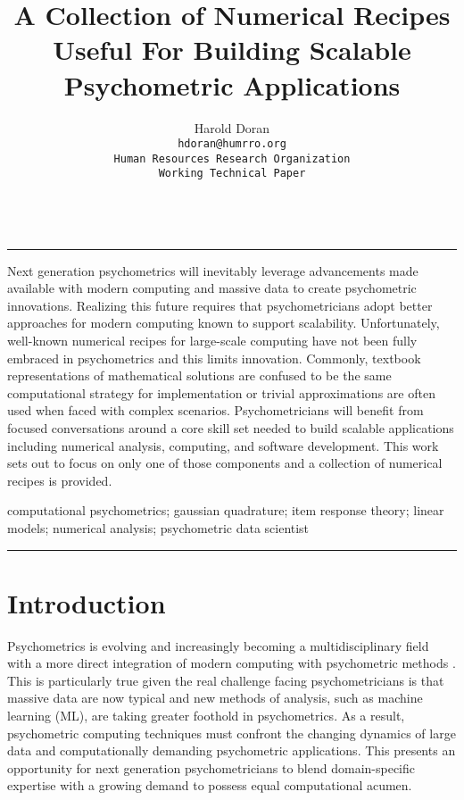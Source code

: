 \documentclass[12pt]{article}
\title{A Collection of Numerical Recipes Useful For Building Scalable Psychometric Applications}
\author{Harold Doran\\
	\texttt{hdoran@humrro.org}\\
	\texttt{Human Resources Research Organization}\\
	\texttt{Working Technical Paper}\\	\\
	}
\renewenvironment{abstract}
 {\quotation\small\noindent\rule{\linewidth}{.5pt}\par\smallskip
  {\centering\bfseries\abstractname\par}\medskip}
 {\par\noindent\rule{\linewidth}{.5pt}\endquotation}
\begin{document}
 
\maketitle

\begin{abstract}

Next generation psychometrics will inevitably leverage advancements made available with modern computing and massive data to create psychometric innovations. Realizing this future requires that psychometricians adopt better approaches for modern computing known to support scalability. Unfortunately, well-known numerical recipes for large-scale computing have not been fully embraced in psychometrics and this limits innovation. Commonly, textbook representations of mathematical solutions are confused to be the same computational strategy for implementation or trivial approximations are often used when faced with complex scenarios. Psychometricians will benefit from focused conversations around a core skill set needed to build scalable applications including numerical analysis, computing, and software development. This work sets out to focus on only one of those components and a collection of numerical recipes is provided. 
 
\vspace{0.2in}

 computational psychometrics; gaussian quadrature; item response theory; linear models; numerical analysis; psychometric data scientist

\end{abstract}

\section*{Introduction}

Psychometrics is evolving and increasingly becoming a multidisciplinary field with a more direct integration of modern computing with psychometric methods \cite{act}. This is particularly true given the real challenge facing psychometricians is that massive data are now typical and new methods of analysis, such as machine learning (ML), are taking greater foothold in psychometrics. As a result, psychometric computing techniques must confront the changing dynamics of large data and computationally demanding psychometric applications. This presents an opportunity for next generation psychometricians to blend domain-specific expertise with a growing demand to possess equal computational acumen.
\end{document}
